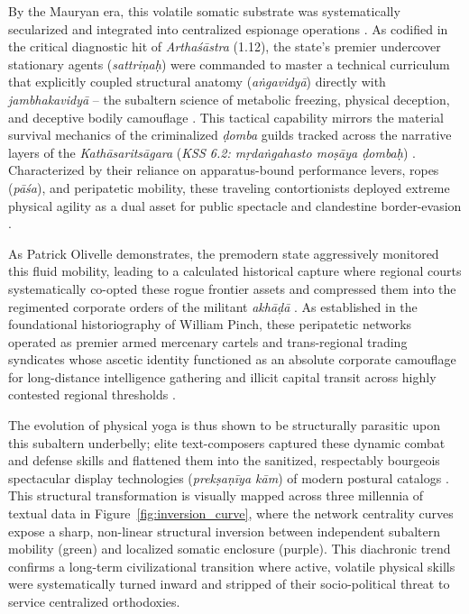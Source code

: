\documentclass[11pt,twoside,letterpaper]{article}
\begin{document}
By the Mauryan era, this volatile somatic substrate was systematically secularized and integrated into centralized espionage operations \citep{McCartney2026}. As codified in the critical diagnostic hit of \textit{Arthaśāstra} (1.12), the state’s premier undercover stationary agents (\textit{sattriṇaḥ}) were commanded to master a technical curriculum that explicitly coupled structural anatomy (\textit{aṅgavidyā}) directly with \textit{jambhakavidyā} – the subaltern science of metabolic freezing, physical deception, and deceptive bodily camouflage \citep{McCartney2026}. This tactical capability mirrors the material survival mechanics of the criminalized \textit{ḍomba} guilds tracked across the narrative layers of the \textit{Kathāsaritsāgara} (\textit{KSS 6.2: mṛdaṅgahasto moṣāya ḍombaḥ}) \citep{McCartneyForthcomingB}. Characterized by their reliance on apparatus-bound performance levers, ropes (\textit{pāśa}), and peripatetic mobility, these traveling contortionists deployed extreme physical agility as a dual asset for public spectacle and clandestine border-evasion \citep{McCartney2026, McCartneyForthcomingB}.

As Patrick Olivelle demonstrates, the premodern state aggressively monitored this fluid mobility, leading to a calculated historical capture where regional courts systematically co-opted these rogue frontier assets and compressed them into the regimented corporate orders of the militant \textit{akhāḍā} \citep{Clark2006, Olivelle1987}. As established in the foundational historiography of William Pinch, these peripatetic networks operated as premier armed mercenary cartels and trans-regional trading syndicates whose ascetic identity functioned as an absolute corporate camouflage for long-distance intelligence gathering and illicit capital transit across highly contested regional thresholds \citep{Pinch1996, Pinch2012}. 

The evolution of physical yoga is thus shown to be structurally parasitic upon this subaltern underbelly; elite text-composers captured these dynamic combat and defense skills and flattened them into the sanitized, respectably bourgeois spectacular display technologies (\textit{prekṣaṇīya kām}) of modern postural catalogs \citep{Birch2024, Danta2015}. This structural transformation is visually mapped across three millennia of textual data in Figure~\ref{fig:inversion_curve}, where the network centrality curves expose a sharp, non-linear structural inversion between independent subaltern mobility (green) and localized somatic enclosure (purple). This diachronic trend confirms a long-term civilizational transition where active, volatile physical skills were systematically turned inward and stripped of their socio-political threat to service centralized orthodoxies.
\end{document}
